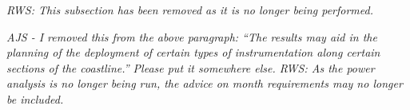\documentclass{ametsoc}
\begin{document}


\emph{RWS: This subsection has been removed as it is no longer being performed.}

\emph{AJS - I removed this from the above paragraph: ``The results may aid in the planning of the deployment of certain types of instrumentation along certain sections of the coastline.'' Please put it somewhere else. RWS: As the power analysis is no longer being run, the advice on month requirements may no longer be included.}
\end{document}
